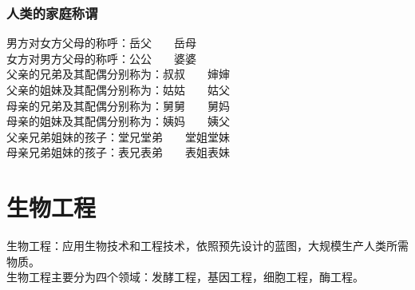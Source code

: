 \documentclass[UTF8]{ctexart}
\begin{document}
\subsubsection{人类的家庭称谓}
    男方对女方父母的称呼：岳父~~~~岳母\\[2mm]
    女方对男方父母的称呼：公公~~~~婆婆\\[2mm]
    父亲的兄弟及其配偶分别称为：叔叔~~~~婶婶\\[2mm]
    父亲的姐妹及其配偶分别称为：姑姑~~~~姑父\\[2mm]
    母亲的兄弟及其配偶分别称为：舅舅~~~~舅妈\\[2mm]
    母亲的姐妹及其配偶分别称为：姨妈~~~~姨父\\[2mm]
    父亲兄弟姐妹的孩子：堂兄堂弟~~~~堂姐堂妹\\[2mm]
    母亲兄弟姐妹的孩子：表兄表弟~~~~表姐表妹

\newpage

\section{生物工程}
    生物工程：应用生物技术和工程技术，依照预先设计的蓝图，大规模生产人类所需物质。\\[3mm]
    生物工程主要分为四个领域：发酵工程，基因工程，细胞工程，酶工程。
\end{document}
